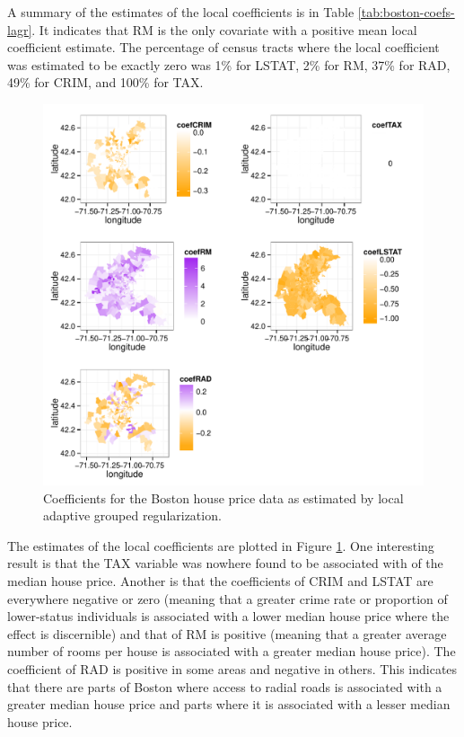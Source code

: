 \documentclass[authoryear,review, 12pt]{elsarticle}
\newcommand{\maxwidth}{\textwidth}
\begin{document}
A summary of the estimates of the local coefficients is in Table \ref{tab:boston-coefs-lagr}.
It indicates that RM is the only covariate with a positive mean local
coefficient estimate. The percentage of census tracts where the local
coefficient was estimated to be exactly zero was 1\%
for LSTAT, 2\%
for RM, 37\%
for RAD, 49\%
for CRIM, and 100\%
for TAX.

\begin{figure}

\includegraphics[width=\maxwidth]{figure/boston-plots} 


\caption{Coefficients for the Boston house price data as estimated by local adaptive grouped regularization.\label{fig:boston-lagr-coefs}}
\end{figure}

The estimates of the local coefficients are plotted in Figure \ref{fig:boston-lagr-coefs}.
One interesting result is that the TAX variable was nowhere found
to be associated with of the median house price. Another is that the
coefficients of CRIM and LSTAT are everywhere negative or zero (meaning
that a greater crime rate or proportion of lower-status individuals
is associated with a lower median house price where the effect is
discernible) and that of RM is positive (meaning that a greater average
number of rooms per house is associated with a greater median house
price). The coefficient of RAD is positive in some areas and negative
in others. This indicates that there are parts of Boston where access
to radial roads is associated with a greater median house price and
parts where it is associated with a lesser median house price.
\end{document}
